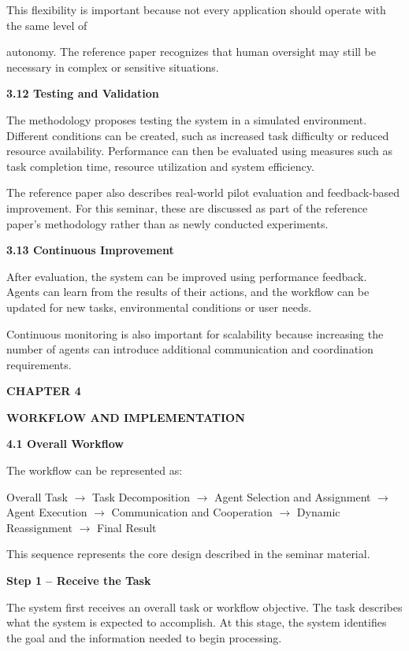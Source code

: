 \documentclass[12pt,letterpaper]{article}
\newcommand{\chaptertitle}[2]{%
  \begin{center}
    {\fontsize{15pt}{18pt}\selectfont\bfseries #1\par}%
    \vspace{2pt}%
    {\fontsize{15pt}{18pt}\selectfont\bfseries #2\par}%
  \end{center}%
  \vspace{10pt}%
}
\newcommand{\sectiontitle}[1]{%
  \vspace{6pt}%
  {\noindent\fontsize{13.2pt}{16pt}\selectfont\bfseries #1\par}%
  \vspace{2pt}%
}
\newcommand{\steptitle}[1]{%
  \vspace{4pt}%
  {\noindent\fontsize{11.3pt}{14pt}\selectfont\bfseries #1\par}%
  \vspace{1pt}%
}
\begin{document}
This flexibility is important because not every application should operate with the same level of
\newpage

autonomy. The reference paper recognizes that human oversight may still be necessary in complex or sensitive situations.

\sectiontitle{3.12 Testing and Validation}
The methodology proposes testing the system in a simulated environment. Different conditions can be created, such as increased task difficulty or reduced resource availability. Performance can then be evaluated using measures such as task completion time, resource utilization and system efficiency.

The reference paper also describes real-world pilot evaluation and feedback-based improvement. For this seminar, these are discussed as part of the reference paper's methodology rather than as newly conducted experiments.

\sectiontitle{3.13 Continuous Improvement}
After evaluation, the system can be improved using performance feedback. Agents can learn from the results of their actions, and the workflow can be updated for new tasks, environmental conditions or user needs.

Continuous monitoring is also important for scalability because increasing the number of agents can introduce additional communication and coordination requirements.
\newpage

\chaptertitle{CHAPTER 4}{WORKFLOW AND IMPLEMENTATION}

\sectiontitle{4.1 Overall Workflow}
The workflow can be represented as:

\vspace{2pt}
\noindent Overall Task $\rightarrow$ Task Decomposition $\rightarrow$ Agent Selection and Assignment $\rightarrow$ Agent Execution $\rightarrow$ Communication and Cooperation $\rightarrow$ Dynamic Reassignment $\rightarrow$ Final Result\par
\vspace{4pt}

This sequence represents the core design described in the seminar material.

\steptitle{Step 1 – Receive the Task}
The system first receives an overall task or workflow objective. The task describes what the system is expected to accomplish. At this stage, the system identifies the goal and the information needed to begin processing.
\end{document}
